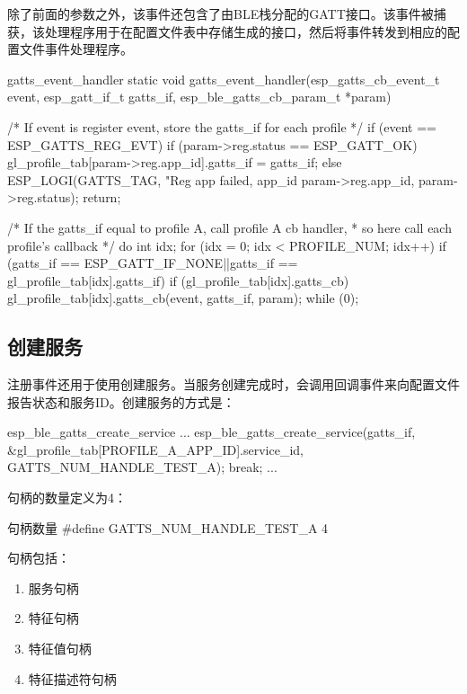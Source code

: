 \documentclass[lang=cn,newtx,10pt,scheme=chinese]{elegantbook}
\begin{document}
除了前面的参数之外，该事件还包含了由BLE栈分配的GATT接口。该事件被捕获，该处理程序用于在配置文件表中存储生成的接口，然后将事件转发到相应的配置文件事件处理程序。

\begin{mycode}{gatts\_event\_handler}
static void gatts_event_handler(esp_gatts_cb_event_t event, esp_gatt_if_t gatts_if, esp_ble_gatts_cb_param_t *param)
{
    /* If event is register event, store the gatts_if for each profile */
    if (event == ESP_GATTS_REG_EVT) {
        if (param->reg.status == ESP_GATT_OK) {
            gl_profile_tab[param->reg.app_id].gatts_if = gatts_if;
        } else {
            ESP_LOGI(GATTS_TAG, "Reg app failed, app_id %
                    param->reg.app_id,
                    param->reg.status);
            return;
        }
    }

/* If the gatts_if equal to profile A, call profile A cb handler,
 * so here call each profile's callback */
    do {
        int idx;
        for (idx = 0; idx < PROFILE_NUM; idx++) {
            if (gatts_if == ESP_GATT_IF_NONE||gatts_if == gl_profile_tab[idx].gatts_if) {
                if (gl_profile_tab[idx].gatts_cb) {
                    gl_profile_tab[idx].gatts_cb(event, gatts_if, param);
                }
            }
        }
    } while (0);
}
\end{mycode}

\subsection{创建服务}

注册事件还用于使用创建服务。当服务创建完成时，会调用回调事件来向配置文件报告状态和服务ID。创建服务的方式是：

\begin{mycode}{esp\_ble\_gatts\_create\_service}
...
esp_ble_gatts_create_service(gatts_if, &gl_profile_tab[PROFILE_A_APP_ID].service_id, GATTS_NUM_HANDLE_TEST_A);
break;
...
\end{mycode}

句柄的数量定义为4：

\begin{mycode}{句柄数量}
#define GATTS_NUM_HANDLE_TEST_A 4
\end{mycode}

句柄包括：

\begin{enumerate}
\item 服务句柄
\item 特征句柄
\item 特征值句柄
\item 特征描述符句柄
\end{enumerate}
\end{document}
